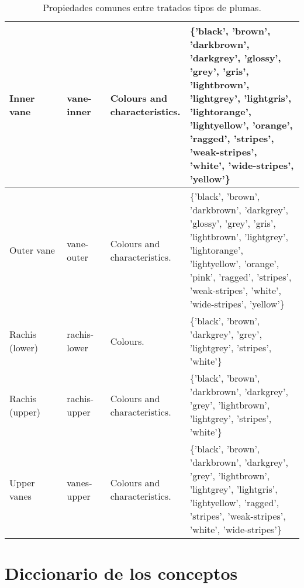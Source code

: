 \documentclass[a4paper,12pt]{article}
\begin{document}
\begin{table}[H]
\begin{tabular}{|p{0.2\linewidth}|p{0.15\linewidth}|p{0.25\linewidth}|p{0.45\linewidth}|}
		Inner vane     & vane-inner   & Colours and characteristics.                  & \{'black', 'brown', 'darkbrown', 'darkgrey', 'glossy', 'grey', 'gris', 'lightbrown', 'lightgrey', 'lightgris', 'lightorange', 'lightyellow', 'orange', 'ragged', 'stripes', 'weak-stripes', 'white', 'wide-stripes', 'yellow'\} \\ \hline
		Outer vane     & vane-outer   & Colours and characteristics.                  & \{'black', 'brown', 'darkbrown', 'darkgrey', 'glossy', 'grey', 'gris', 'lightbrown', 'lightgrey', 'lightorange', 'lightyellow', 'orange', 'pink', 'ragged', 'stripes', 'weak-stripes', 'white', 'wide-stripes', 'yellow'\}      \\ \hline
		Rachis (lower) & rachis-lower & Colours.                                      & \{'black', 'brown', 'darkgrey', 'grey', 'lightgrey', 'stripes', 'white'\}                                                                                                                                                       \\ \hline
		Rachis (upper) & rachis-upper & Colours and characteristics.                  & \{'black', 'brown', 'darkbrown', 'darkgrey', 'grey', 'lightbrown', 'lightgrey', 'stripes', 'white'\}                                                                                                                            \\ \hline
		Upper vanes    & vanes-upper  & Colours and characteristics.                  & \{'black', 'brown', 'darkbrown', 'darkgrey', 'grey', 'lightbrown', 'lightgrey', 'lightgris', 'lightyellow', 'ragged', 'stripes', 'weak-stripes', 'white', 'wide-stripes'\}                                                      \\ \hline
	\end{tabular}
	\caption{Propiedades comunes entre tratados tipos de plumas.}
\end{table}

\section{Diccionario de los conceptos}
\end{document}
